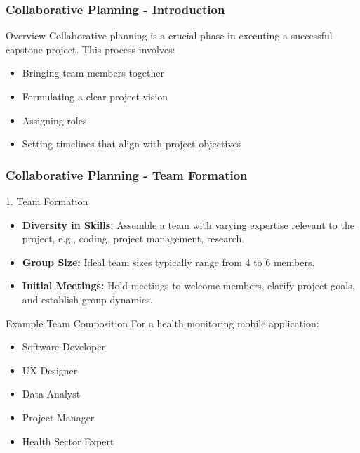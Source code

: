 \documentclass[aspectratio=169]{beamer}
\begin{document}
\begin{frame}[fragile]
    \frametitle{Collaborative Planning - Introduction}
    \begin{block}{Overview}
        Collaborative planning is a crucial phase in executing a successful capstone project. This process involves:
        \begin{itemize}
            \item Bringing team members together
            \item Formulating a clear project vision
            \item Assigning roles
            \item Setting timelines that align with project objectives
        \end{itemize}
    \end{block}
\end{frame}

\begin{frame}[fragile]
    \frametitle{Collaborative Planning - Team Formation}
    \begin{block}{1. Team Formation}
        \begin{itemize}
            \item \textbf{Diversity in Skills:} Assemble a team with varying expertise relevant to the project, e.g., coding, project management, research.
            \item \textbf{Group Size:} Ideal team sizes typically range from 4 to 6 members.
            \item \textbf{Initial Meetings:} Hold meetings to welcome members, clarify project goals, and establish group dynamics.
        \end{itemize}
        
        \begin{exampleblock}{Example Team Composition}
            For a health monitoring mobile application:
            \begin{itemize}
                \item Software Developer
                \item UX Designer
                \item Data Analyst
                \item Project Manager
                \item Health Sector Expert
            \end{itemize}
        \end{exampleblock}
    \end{block}
\end{frame}
\end{document}
